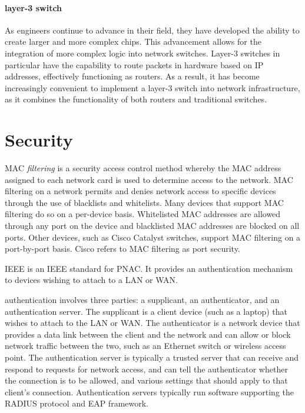 


\paragraph{layer-3 switch}
As engineers continue to advance in their field, they have developed the ability to create larger and more complex chips.
This advancement allows for the integration of more complex logic into network switches.
Layer-3 switches in particular have the capability to route packets in hardware based on \acs{IP} addresses, effectively functioning as routers.
As a result, it has become increasingly convenient to implement a layer-3 switch into network infrastructure, as it combines the functionality of both routers and traditional switches.




\section{Security}

\ac{MAC} \emph{filtering} is a security access control method whereby the \acs{MAC} address assigned to each network card is used to determine access to the network.
\ac{MAC} filtering on a network permits and denies network access to specific devices through the use of blacklists and whitelists.
Many devices that support \acs{MAC} filtering do so on a per-device basis.
Whitelisted \ac{MAC} addresses are allowed through any port on the device and blacklisted \acs{MAC} addresses are blocked on all ports.
Other devices, such as Cisco Catalyst switches, support \acs{MAC} filtering on a port-by-port basis.
Cisco refers to \acs{MAC} filtering as port security.

\acs{IEEE}  is an \acs{IEEE} standard for \ac{PNAC}.
It provides an authentication mechanism to devices wishing to attach to a \ac{LAN} or \ac{WAN}.

 authentication involves three parties: a supplicant, an authenticator, and an authentication server.
The supplicant is a client device (such as a laptop) that wishes to attach to the \ac{LAN} or \ac{WAN}.
The authenticator is a network device that provides a data link between the client and the network and can allow or block network traffic between the two, such as an Ethernet switch or wireless access point.
The authentication server is typically a trusted server that can receive and respond to requests for network access, and can tell the authenticator whether the connection is to be allowed, and various settings that should apply to that client's connection.
Authentication servers typically run software supporting the \ac{RADIUS} protocol and \ac{EAP} framework.


